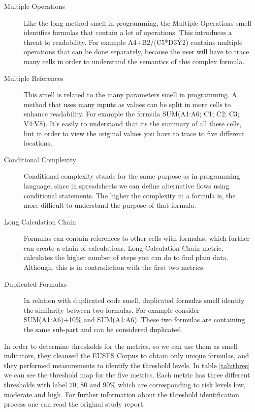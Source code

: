 \begin{description}
\item [Multiple Operations] Like the long method smell in programming, the Multiple Operations smell identifies formulas that contain a lot of operations. This introduces a threat to readability. For example A4+B2/(C5*D3\^Y2) contains multiple operations that can be done separately, because the user will have to trace many cells in order to understand the semantics of this complex formula.
\item[Multiple References] This smell is related to the many parameters smell in programming. A method that uses many inputs as values can be split in more cells to enhance readability. For example the formula SUM(A1:A6; C1; C2; C3; V4:V8). It's easily to understand that its the summary of all these cells, but in order to view the original values you have to trace to five different locations.
\item[Conditional Complexity] Conditional complexity stands for the same purpose as in programming language, since in spreadsheets we can define alternative flows using conditional statements. The higher the complexity in a formula is, the more difficult to understand the purpose of that formula.
\item[Long Calculation Chain] Formulas can contain references to other cells with formulas, which further can create a chain of calculations. Long Calculation Chain metric, calculates the higher number of steps you can do to find plain data. Although, this is in contradiction with the first two metrics. 
\item[Duplicated Formulas] In relation with duplicated code smell, duplicated formulas smell identify the similarity between two formulas. For example consider SUM(A1:A6)+10\% and SUM(A1:A6). These two formulas are containing the same sub-part and can be considered duplicated.
\end{description}

In order to determine thresholds for the metrics, so we can use them as smell indicators, they cleansed the EUSES Corpus to obtain only unique formulas, and they performed measurements to identify the threshold levels. In table \ref{tab:thres} we can see the threshold map for the five metrics. Each metric has three different thresholds with label 70, 80 and 90\% which are corresponding to risk levels low, moderate and high. For further information about the threshold identification process one can read the original study report\cite{feliene1}.


